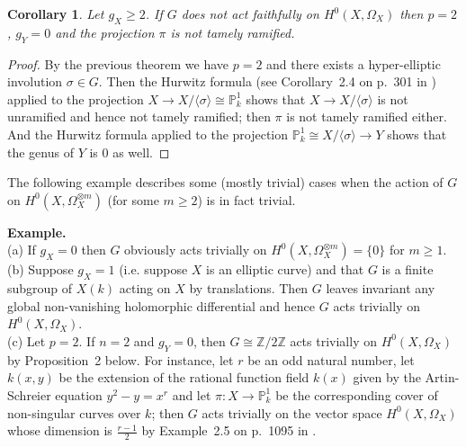 \documentclass[11pt]{article} %
\newtheorem{cor}{Corollary}
\newcommand{\ra}{\rightarrow}
\newcommand{\PP}{{\mathbb P}}
\newcommand{\ZZ}{{\mathbb Z}}
\begin{document}
  \begin{cor}
    Let $g_X \ge 2$. 
    If $G$ does not act faithfully on $H^0(X,\Omega_X)$ then $p=2$, $g_Y =0$ and the projection $\pi$ is not tamely ramified.
  \end{cor}
  \begin{proof}
    By the previous theorem we have $p=2$ and there exists a hyper-elliptic involution $\sigma \in G$. 
    Then the Hurwitz formula (see Corollary~2.4 on p.~301 in \cite{Ha}) applied to the projection $X\rightarrow X/\langle \sigma \rangle \cong \PP^1_k$ shows that $X\rightarrow X/\langle \sigma \rangle$ is not unramified and hence not tamely ramified; then $\pi$ is not tamely ramified either. 
    And the Hurwitz formula applied to the projection $\PP^1_k\cong X/\langle \sigma \rangle \ra  Y$ shows that the genus of $Y$ is $0$ as well.
  \end{proof}

The following example describes some (mostly trivial) cases when the action of $G$ on $H^0(X, \Omega_X^{\otimes m})$ (for some $m\geq 2$) is in fact trivial.

{\bf Example.}\\
  (a) If $g_X = 0$ then $G$ obviously acts trivially on $H^0(X,\Omega_X^{\otimes m}) = \{0\}$ for $m\geq 1$.\\

  (b) Suppose $g_X =1 $ (i.e. suppose $X$ is an elliptic curve) and that $G$ is a finite subgroup of $X(k)$ acting on $X$ by translations.
  Then $G$ leaves invariant any global non-vanishing holomorphic differential and hence $G$ acts trivially on $H^0(X,\Omega_X)$.\\

  (c) Let $p=2$. 
  If $n=2$ and $g_Y =0$, then $G \cong \ZZ/2\ZZ$ acts trivially on $H^0(X, \Omega_X)$ by Proposition~2 below.
  For instance, let $r$ be an odd natural number, let $k(x,y)$ be the extension of the rational function field $k(x)$ given by the Artin-Schreier equation $y^2-y = x^r$ and let $\pi: X \rightarrow \PP^1_k$ be the corresponding cover of non-singular curves over $k$; 
  then $G$ acts trivially on the vector space $H^0(X,\Omega_X)$ whose dimension is $\frac{r-1}{2}$ by Example~2.5 on p.~1095 in \cite{Ko}.
\end{document}
